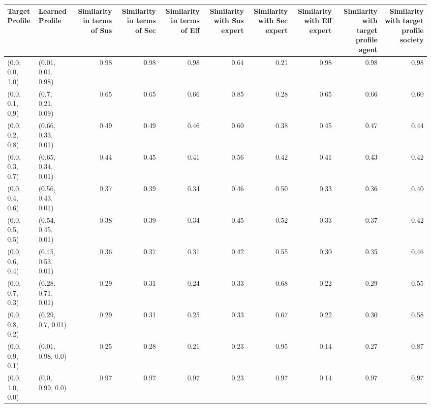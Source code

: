 \begin{tabular}{llrrrrrrrr}
\toprule
Target Profile & Learned Profile & Similarity in terms of Sus & Similarity in terms of Sec & Similarity in terms of Eff & Similarity with Sus expert & Similarity with Sec expert & Similarity with Eff expert & Similarity with target profile agent & Similarity with target profile society \\
\midrule
(0.0, 0.0, 1.0) & (0.01, 0.01, 0.98) & 0.98 & 0.98 & 0.98 & 0.64 & 0.21 & 0.98 & 0.98 & 0.98 \\
(0.0, 0.1, 0.9) & (0.7, 0.21, 0.09) & 0.65 & 0.65 & 0.66 & 0.85 & 0.28 & 0.65 & 0.66 & 0.60 \\
(0.0, 0.2, 0.8) & (0.66, 0.33, 0.01) & 0.49 & 0.49 & 0.46 & 0.60 & 0.38 & 0.45 & 0.47 & 0.44 \\
(0.0, 0.3, 0.7) & (0.65, 0.34, 0.01) & 0.44 & 0.45 & 0.41 & 0.56 & 0.42 & 0.41 & 0.43 & 0.42 \\
(0.0, 0.4, 0.6) & (0.56, 0.43, 0.01) & 0.37 & 0.39 & 0.34 & 0.46 & 0.50 & 0.33 & 0.36 & 0.40 \\
(0.0, 0.5, 0.5) & (0.54, 0.45, 0.01) & 0.38 & 0.39 & 0.34 & 0.45 & 0.52 & 0.33 & 0.37 & 0.42 \\
(0.0, 0.6, 0.4) & (0.45, 0.53, 0.01) & 0.36 & 0.37 & 0.31 & 0.42 & 0.55 & 0.30 & 0.35 & 0.46 \\
(0.0, 0.7, 0.3) & (0.28, 0.71, 0.01) & 0.29 & 0.31 & 0.24 & 0.33 & 0.68 & 0.22 & 0.29 & 0.55 \\
(0.0, 0.8, 0.2) & (0.29, 0.7, 0.01) & 0.29 & 0.31 & 0.25 & 0.33 & 0.67 & 0.22 & 0.30 & 0.58 \\
(0.0, 0.9, 0.1) & (0.01, 0.98, 0.0) & 0.25 & 0.28 & 0.21 & 0.23 & 0.95 & 0.14 & 0.27 & 0.87 \\
(0.0, 1.0, 0.0) & (0.0, 0.99, 0.0) & 0.97 & 0.97 & 0.97 & 0.23 & 0.97 & 0.14 & 0.97 & 0.97 \\
\bottomrule
\end{tabular}
